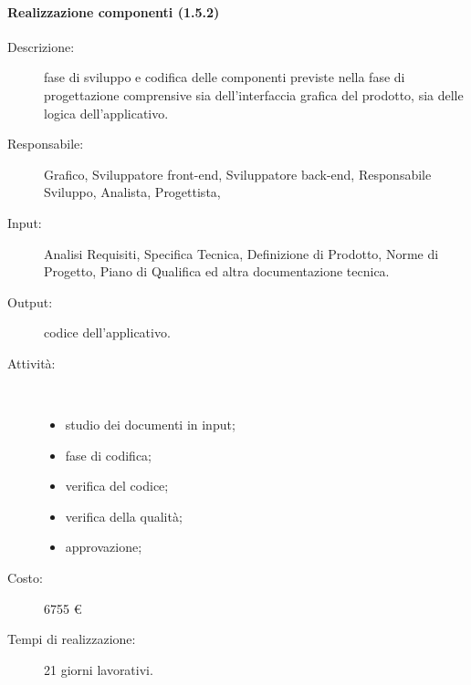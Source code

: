\paragraph{Realizzazione componenti (1.5.2)}
\begin{description}
\item[Descrizione:] fase di sviluppo e codifica delle componenti previste nella fase di progettazione comprensive sia dell'interfaccia grafica del prodotto, sia delle logica dell'applicativo.
\item[Responsabile:] Grafico, Sviluppatore front-end, Sviluppatore back-end, Responsabile Sviluppo, Analista, Progettista,
\item[Input:] Analisi Requisiti, Specifica Tecnica, Definizione di Prodotto, Norme di Progetto, Piano di Qualifica ed altra documentazione tecnica.
\item[Output:] codice dell'applicativo.
\item[Attività:]\mbox{}\\[-1.5\baselineskip]
	\begin{itemize}
	\item studio dei documenti in input;
	\item fase di codifica;
	\item verifica del codice;
	\item verifica della qualit\`{a};
	\item approvazione;
	\end{itemize}
\item[Costo:] 6755 \euro{}
\item[Tempi di realizzazione:] 21 giorni lavorativi.
\end{description}

